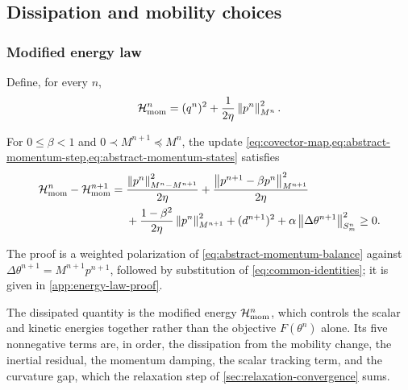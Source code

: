 \subsection{Dissipation and mobility choices}
\label{sec:dissipation-mobilities}

\subsubsection{Modified energy law}

Define, for every \(n\),
\begin{equation}
  \mathcal{H}_{\mathrm{mom}}^n
  =(q^n)^2+\frac{1}{2\eta}\left\lVert p^n\right\rVert_{M^n}^2.
  \label{eq:abstract-momentum-energy}
\end{equation}

\begin{theorem}
\label{thm:monotone-mobility-dissipation}
For \(0\leq\beta<1\) and \(0\prec M^{n+1}\preceq M^n\), the update
\cref{eq:covector-map,eq:abstract-momentum-step,eq:abstract-momentum-states}
satisfies
\begin{equation}
\begin{aligned}
  \mathcal{H}_{\mathrm{mom}}^n
  -\mathcal{H}_{\mathrm{mom}}^{n+1}
  ={}&\frac{\left\lVert p^n\right\rVert_{M^n-M^{n+1}}^2}{2\eta}
  +\frac{\left\lVert p^{n+1}-\beta p^n\right\rVert_{M^{n+1}}^2}{2\eta}\\
  &+\frac{1-\beta^2}{2\eta}\left\lVert p^n\right\rVert_{M^{n+1}}^2
  +(d^{n+1})^2
  +\alpha\left\lVert\Delta\theta^{n+1}\right\rVert_{S_m^n}^2
  \geq0.
\end{aligned}
\label{eq:monotone-mobility-dissipation}
\end{equation}
\end{theorem}

The proof is a weighted polarization of
\cref{eq:abstract-momentum-balance} against
\(\Delta\theta^{n+1}=M^{n+1}p^{n+1}\), followed by substitution of
\cref{eq:common-identities}; it is given in \cref{app:energy-law-proof}.

\begin{remark}
\label{rem:dissipated-quantity}
The dissipated quantity is the modified energy \(\mathcal{H}_{\mathrm{mom}}^n\),
which controls the scalar and kinetic energies together rather than the
objective \(F(\theta^n)\) alone. Its five nonnegative terms are, in order,
the dissipation from the mobility change, the inertial residual, the momentum
damping, the scalar tracking term, and the curvature gap, which the
relaxation step of \cref{sec:relaxation-convergence} sums.
\end{remark}


